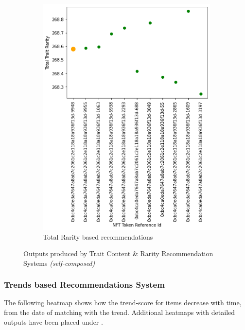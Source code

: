 \begin{figure}[h!]
\begin{subfigure}[b]{0.45\textwidth}
         \includegraphics[width=\textwidth]{images/Testing/trait/Trait rarity representation graph - rarity recommendations.png}
         \caption{Total Rarity based recommendations}
         \label{fig:total-rarity-output}
     \end{subfigure}
     \hfill
        \caption{Outputs produced by Trait Content \& Rarity Recommendation Systems \textit{(self-composed)}}
        \label{fig:trait-recs-outputs}
\end{figure}



\subsubsection{Trends based Recommendations System}

The following heatmap shows how the trend-score for items decrease with time, from the date of matching with the trend. Additional heatmaps with detailed outputs have been placed under \textit{}.

